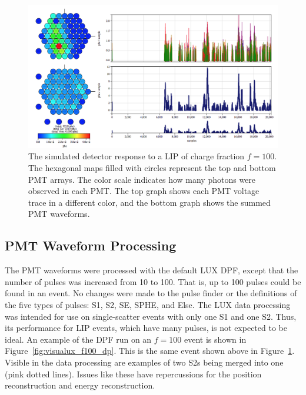 \begin{figure}[htbp]
\begin{center}
\includegraphics[width=\textwidth]{figures/lips/visualux_f100.png}
\caption{The simulated detector response to a \acs{LIP} of charge fraction $f=100$. The hexagonal maps filled with circles represent the top and bottom \acs{PMT} arrays. The color scale indicates how many photons were observed in each \acs{PMT}. The top graph shows each \acs{PMT} voltage trace in a different color, and the bottom graph shows the summed \acs{PMT} waveforms.  }
\label{fig:visualux_f100}
\end{center}
\end{figure}

\FloatBarrier
\subsection{PMT Waveform Processing}
The \ac{PMT} waveforms were processed with the default \ac{LUX} \ac{DPF}, except that the number of pulses was increased from 10 to 100. That is, up to 100 pulses could be found in an event. No changes were made to the pulse finder or the definitions of the five types of pulses: S1, S2, SE, SPHE, and Else. The \ac{LUX} data processing was intended for use on single-scatter events with only one S1 and one S2. Thus, its performance for \ac{LIP} events, which have many pulses, is not expected to be ideal. An example of the \ac{DPF} run on an $f=100$ event is shown in Figure~\ref{fig:visualux_f100_dp}. This is the same event shown above in Figure~\ref{fig:visualux_f100}. Visible in the data processing are examples of two S2s being merged into one (pink dotted lines). Issues like these have repercussions for the position reconstruction and energy reconstruction. 

